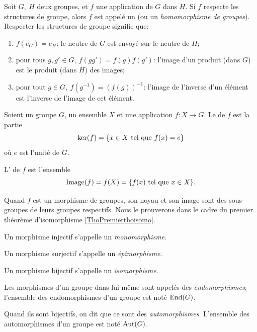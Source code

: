 \begin{definition}
    Soit \(G,\ H\) deux groupes, et \(f \) une application de \(G \) dans \(H \). Si \(f \) respecte les structures de groupe, alors \(f \) est appelé un  (ou un \emph{homomorphisme de groupes}). Respecter les structures de groupe signifie que:
    \begin{enumerate}
    \item \( f(e_G) = e_H \): le neutre de \( G \) est envoyé sur le neutre de \( H \);
    \item pour tous \(g, g' \in G,\ f(gg') = f(g)f(g')\): l'image d'un produit (dans \(G \)) est le produit (dans \( H \)) des images;
    \item pour tout \(g \in G,\ f(g^{-1}) = \left(f(g)\right)^{-1}\): l'image de l'inverse d'un élément est l'inverse de l'image de cet élément.
    \end{enumerate}
\end{definition}


\begin{definition}      \label{DEFooWBIYooGNRYOp}
    Soient un groupe \( G\), un ensemble $X$ et une application \( f\colon X\to G\). Le  de \( f\) est la partie
    \begin{equation}
        \ker(f)=\{ x\in X\text{ tel que } f(x)=e \}
    \end{equation}
    où \( e\) est l'unité de \( G\).
    
    L' de \(f \) est l'ensemble 
    \begin{equation}
        \operatorname{Image}(f)=f(X) = \{ f(x) \text{ tel que } x\in X \}.
    \end{equation}
\end{definition}

\begin{remark}
  Quand \( f \) est un morphisme de groupes, son noyau et son image sont des sous-groupes de leurs groupes respectifs. Nous le prouverons dans le cadre du premier théorème d'isomorphisme \ref{ThoPremierthoisomo}.
\end{remark}

\begin{definition}\label{DEFGroupesTypesdeMorphismes}
Un morphisme injectif s'appelle un \emph{monomorphisme}.

Un morphisme surjectif s'appelle un \emph{épimorphisme}.

Un morphisme bijectif s'appelle un \emph{isomorphisme}.

Les morphismes d'un groupe dans lui-même sont appelés des \emph{endomorphismes}; l'ensemble des endomorphismes d'un groupe est noté \( \operatorname{End}(G) \).

Quand ils sont bijectifs, on dit que ce sont des \emph{automorphismes}.  L'ensemble des automorphismes d'un groupe est noté \( \operatorname{Aut}(G) \).
\end{definition}

